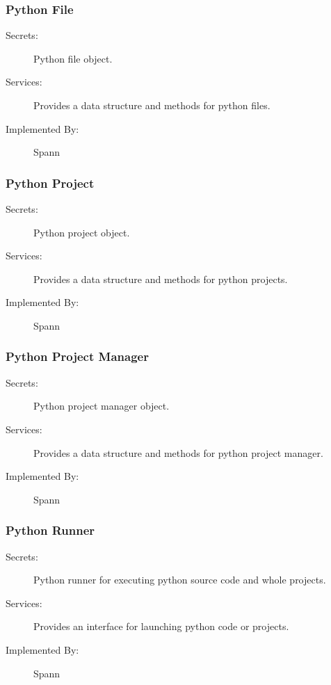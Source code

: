 \documentclass[12pt, titlepage]{article}
\begin{document}
\subsubsection{Python File} \label{mdPythonFile} 

\begin{description}
\item[Secrets:] Python file object.
\item[Services:] Provides a data structure and methods for python files.
\item[Implemented By:] Spann
\end{description}

\subsubsection{Python Project} \label{mdPythonProject} 

\begin{description}
\item[Secrets:] Python project object.
\item[Services:] Provides a data structure and methods for python projects.
\item[Implemented By:] Spann
\end{description}

\subsubsection{Python Project Manager} \label{mdPythonProjectManager}

\begin{description}
\item[Secrets:] Python project manager object.
\item[Services:] Provides a data structure and methods for python project manager.
\item[Implemented By:] Spann
\end{description}

\subsubsection{Python Runner} \label{mdPythonRunner}

\begin{description}
\item[Secrets:] Python runner for executing python source code and whole projects.
\item[Services:] Provides an interface for launching python code or projects.
\item[Implemented By:] Spann
\end{description}
\end{document}

